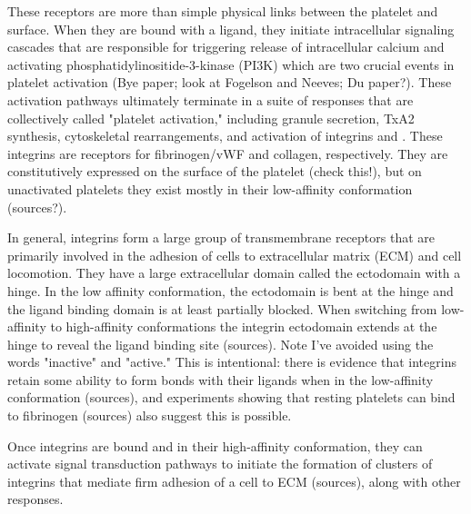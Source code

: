 These receptors are more than simple physical links between the
platelet and surface. When they are bound with a ligand, they initiate
intracellular signaling cascades that are responsible for triggering
release of intracellular calcium and activating
phosphatidylinositide-3-kinase (PI3K) which are two crucial events in
platelet activation (Bye paper; look at Fogelson and Neeves; Du
paper?). These activation pathways ultimately terminate in a suite of
responses that are collectively called "platelet activation,"
including granule secretion, TxA2 synthesis, cytoskeletal
rearrangements, and activation of integrins  and
. These integrins are receptors for fibrinogen/vWF
and collagen, respectively. They are constitutively expressed on the
surface of the platelet (check this!), but on unactivated platelets
they exist mostly in their low-affinity conformation (sources?).
		
In general, integrins form a large group of transmembrane receptors
that are primarily involved in the adhesion of cells to extracellular
matrix (ECM) and cell locomotion. They have a large extracellular
domain called the ectodomain with a hinge. In the low affinity
conformation, the ectodomain is bent at the hinge and the ligand
binding domain is at least partially blocked. When switching from
low-affinity to high-affinity conformations the integrin ectodomain
extends at the hinge to reveal the ligand binding site (sources). Note
I've avoided using the words "inactive" and "active." This is
intentional: there is evidence that integrins retain some ability to
form bonds with their ligands when in the low-affinity conformation
(sources), and experiments showing that resting platelets can bind to
fibrinogen (sources) also suggest this is possible.
		
Once integrins are bound and in their high-affinity conformation, they
can activate signal transduction pathways to initiate the formation of
clusters of integrins that mediate firm adhesion of a cell to ECM
(sources), along with other responses.
	


